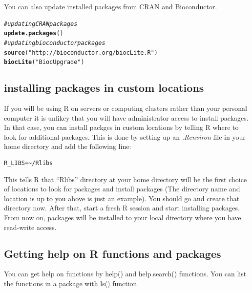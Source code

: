 \documentclass[english,nohyper]{tufte-book}\usepackage[]{graphicx}\usepackage[]{color}
\makeatletter
\newcommand{\hlstr}[1]{\textcolor[rgb]{0.192,0.494,0.8}{#1}}%
\newcommand{\hlcom}[1]{\textcolor[rgb]{0.678,0.584,0.686}{\textit{#1}}}%
\newcommand{\hlstd}[1]{\textcolor[rgb]{0.345,0.345,0.345}{#1}}%
\newcommand{\hlkwd}[1]{\textcolor[rgb]{0.737,0.353,0.396}{\textbf{#1}}}%
\newenvironment{kframe}{%
 \def\at@end@of@kframe{}%
 \ifinner\ifhmode%
  \def\at@end@of@kframe{\end{minipage}}%
  \begin{minipage}{\columnwidth}%
 \fi\fi%
 \def\FrameCommand##1{\hskip\@totalleftmargin \hskip-\fboxsep
 \colorbox{shadecolor}{##1}\hskip-\fboxsep
     \hskip-\linewidth \hskip-\@totalleftmargin \hskip\columnwidth}%
 \MakeFramed {\advance\hsize-\width
   \@totalleftmargin\z@ \linewidth\hsize
   \@setminipage}}%
 {\par\unskip\endMakeFramed%
 \at@end@of@kframe}
\newenvironment{knitrout}{}{} %
\makeatother
\begin{document}
You can also update installed packages from CRAN and Bioconductor.

\begin{knitrout}
\color{fgcolor}\begin{kframe}
\begin{alltt}
\hlcom{# updating CRAN packages}
\hlkwd{update.packages}\hlstd{()}
\hlcom{# updating bioconductor packages}
\hlkwd{source}\hlstd{(}\hlstr{"http://bioconductor.org/biocLite.R"}\hlstd{)}
\hlkwd{biocLite}\hlstd{(}\hlstr{"BiocUpgrade"}\hlstd{)}
\end{alltt}
\end{kframe}
\end{knitrout}



\subsection{installing packages in custom locations}

If you will be using R on servers or computing clusters rather than
your personal computer it is unlikey that you will have administrator
access to install packages. In that case, you can install packges
in custom locations by telling R where to look for additional packages.
This is done by setting up an \emph{.Renviron} file in your home directory
and add the following line:

\begin{verbatim}
R_LIBS=~/Rlibs
\end{verbatim}

This tells R that ``Rlibs'' directory at your home directory will
be the first choice of locations to look for packages and install
packages (The directory name and location is up to you above is just
an example). You should go and create that directory now. After that,
start a fresh R session and start installing packages. From now on,
packages will be installed to your local directory where you have
read-write access.


\subsection{Getting help on R functions and packages}

You can get help on functions by help() and help.search() functions.
You can list the functions in a package with ls() function
\end{document}
